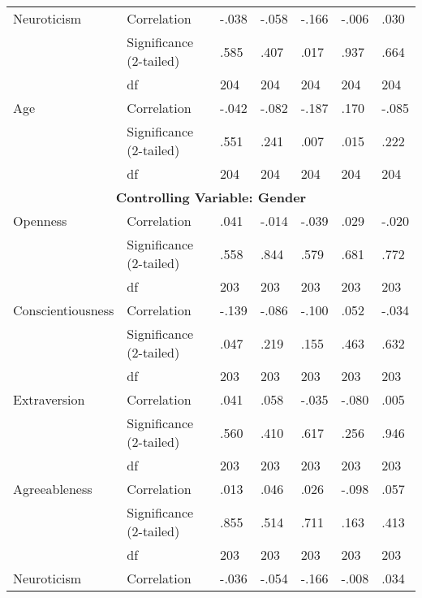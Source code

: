 \documentclass{llncs}
\begin{document}
\begin{table}[]
\begin{tabular}{@{}lllllll@{}}
Neuroticism       & Correlation             & -.038 & -.058   & -.166 & -.006 & .030    \\
                  & Significance (2-tailed) & .585  & .407    & .017  & .937  & .664    \\
                  & df                      & 204   & 204     & 204   & 204   & 204     \\
Age               & Correlation             & -.042 & -.082   & -.187 & .170  & -.085   \\
                  & Significance (2-tailed) & .551  & .241    & .007  & .015  & .222    \\
                  & df                      & 204   & 204     & 204   & 204   & 204     \\
\multicolumn{7}{c}{\textbf{Controlling Variable: Gender}}                               \\
Openness          & Correlation             & .041  & -.014   & -.039 & .029  & -.020   \\
                  & Significance (2-tailed) & .558  & .844    & .579  & .681  & .772    \\
                  & df                      & 203   & 203     & 203   & 203   & 203     \\
Conscientiousness & Correlation             & -.139 & -.086   & -.100 & .052  & -.034   \\
                  & Significance (2-tailed) & .047  & .219    & .155  & .463  & .632    \\
                  & df                      & 203   & 203     & 203   & 203   & 203     \\
Extraversion      & Correlation             & .041  & .058    & -.035 & -.080 & .005    \\
                  & Significance (2-tailed) & .560  & .410    & .617  & .256  & .946    \\
                  & df                      & 203   & 203     & 203   & 203   & 203     \\
Agreeableness     & Correlation             & .013  & .046    & .026  & -.098 & .057    \\
                  & Significance (2-tailed) & .855  & .514    & .711  & .163  & .413    \\
                  & df                      & 203   & 203     & 203   & 203   & 203     \\
Neuroticism       & Correlation             & -.036 & -.054   & -.166 & -.008 & .034    \\

\end{tabular}
\end{table}
\end{document}
